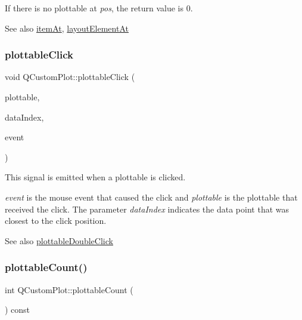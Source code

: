 If there is no plottable at {\itshape pos}, the return value is 0.

\begin{DoxySeeAlso}{See also}
\mbox{\hyperlink{class_q_custom_plot_ac08578e0e6c059c83a8d340ba0038e8e}{item\+At}}, \mbox{\hyperlink{class_q_custom_plot_afaa1d304e0287d140fd238e90889ef3c}{layout\+Element\+At}} 
\end{DoxySeeAlso}
\mbox{\label{class_q_custom_plot_af5fe78b8bc9e4e96df921612837fd4fd}} 
\subsubsection{\texorpdfstring{plottable\+Click}{plottableClick}}
{\footnotesize\ttfamily void Q\+Custom\+Plot\+::plottable\+Click (\begin{DoxyParamCaption}\item[{\mbox{\hyperlink{class_q_c_p_abstract_plottable}{Q\+C\+P\+Abstract\+Plottable}} $\ast$}]{plottable,  }\item[{int}]{data\+Index,  }\item[{Q\+Mouse\+Event $\ast$}]{event }\end{DoxyParamCaption})\hspace{0.3cm}{\ttfamily [signal]}}

This signal is emitted when a plottable is clicked.

{\itshape event} is the mouse event that caused the click and {\itshape plottable} is the plottable that received the click. The parameter {\itshape data\+Index} indicates the data point that was closest to the click position.

\begin{DoxySeeAlso}{See also}
\mbox{\hyperlink{class_q_custom_plot_a86a3ab7263c9c4e008e70d6c5fce9fbd}{plottable\+Double\+Click}} 
\end{DoxySeeAlso}
\mbox{\label{class_q_custom_plot_a5f4f15991c14bf9ad659bb2a19dfbed4}} 
\subsubsection{\texorpdfstring{plottable\+Count()}{plottableCount()}}
{\footnotesize\ttfamily int Q\+Custom\+Plot\+::plottable\+Count (\begin{DoxyParamCaption}{ }\end{DoxyParamCaption}) const}

